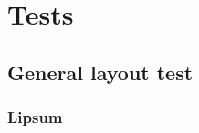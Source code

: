 \documentclass{tufte-book}
\begin{document}
\part{Tests}
\chapter{General layout test}
\section{Lipsum}
\lipsum[2-4]
\end{document}
